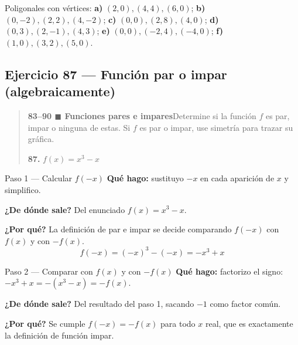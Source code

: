 \documentclass[11pt]{article}
\begin{document}
\begin{resp}
Poligonales con vértices: \textbf{a)} $(2,0),(4,4),(6,0)$; \textbf{b)} $(0,-2),(2,2),(4,-2)$; \textbf{c)} $(0,0),(2,8),(4,0)$; \textbf{d)} $(0,3),(2,-1),(4,3)$; \textbf{e)} $(0,0),(-2,4),(-4,0)$; \textbf{f)} $(1,0),(3,2),(5,0)$.
\end{resp}

\subsection*{Ejercicio 87 — Función par o impar (algebraicamente)}

\begin{quote}
\textbf{83--90 $\blacksquare$ Funciones pares e impares}\quad Determine si la función $f$ es par, impar o ninguna de estas. Si $f$ es par o impar, use simetría para trazar su gráfica.

\textbf{87.} $f(x)=x^3-x$
\end{quote}

\begin{paso}{Paso 1 --- Calcular $f(-x)$}
\textbf{Qué hago:} sustituyo $-x$ en cada aparición de $x$ y simplifico.

\textbf{¿De dónde sale?} Del enunciado $f(x)=x^3-x$.

\textbf{¿Por qué?} La definición de par e impar se decide comparando $f(-x)$ con $f(x)$ y con $-f(x)$.
\[
f(-x)=(-x)^3-(-x)=-x^3+x
\]
\end{paso}

\begin{paso}{Paso 2 --- Comparar con $f(x)$ y con $-f(x)$}
\textbf{Qué hago:} factorizo el signo: $-x^3+x=-(x^3-x)=-f(x)$.

\textbf{¿De dónde sale?} Del resultado del paso 1, sacando $-1$ como factor común.

\textbf{¿Por qué?} Se cumple $f(-x)=-f(x)$ para todo $x$ real, que es exactamente la definición de función impar.
\end{paso}
\end{document}
